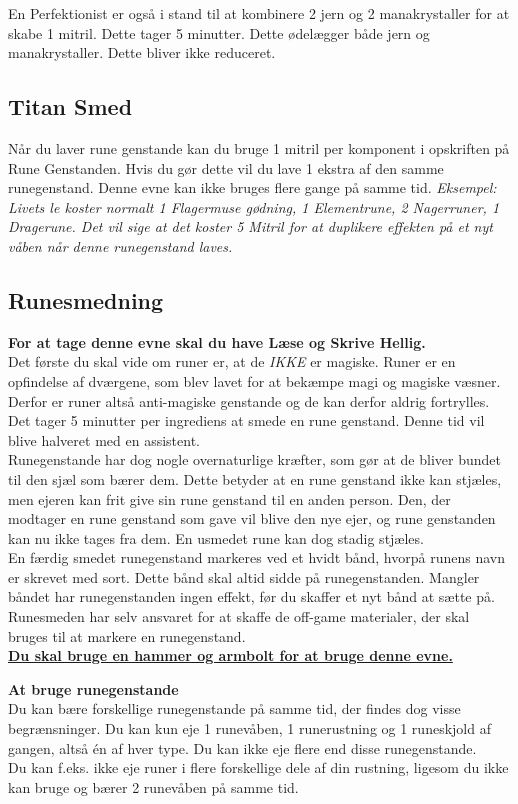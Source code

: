 En Perfektionist er også i stand til at kombinere 2 jern og 2 manakrystaller for at skabe 1 mitril. Dette tager 5 minutter. Dette ødelægger både jern og manakrystaller. Dette bliver ikke reduceret.

\subsection{Titan Smed}
Når du laver rune genstande kan du bruge 1 mitril per komponent i opskriften på Rune Genstanden. Hvis du gør dette vil du lave 1 ekstra af den samme runegenstand. Denne evne kan ikke bruges flere gange på samme tid.
\textit{Eksempel: Livets le koster normalt 1 Flagermuse gødning, 1 Elementrune, 2 Nagerruner, 1 Dragerune. Det vil sige at det koster 5 Mitril for at duplikere effekten på et nyt våben når denne runegenstand laves.}

\subsection{Runesmedning}
\textbf{For at tage denne evne skal du have Læse og Skrive Hellig.}\\
Det første du skal vide om runer er, at de \emph{IKKE} er magiske. Runer er en opfindelse af dværgene, som blev lavet for at bekæmpe magi og magiske væsner. Derfor er runer altså anti-magiske genstande og de kan derfor aldrig fortrylles.\\
Det tager 5 minutter per ingrediens at smede en rune genstand. Denne tid vil blive halveret med en assistent.\\
Runegenstande har dog nogle overnaturlige kræfter, som gør at de bliver bundet til den sjæl som bærer dem. Dette betyder at en rune genstand ikke kan stjæles, men ejeren kan frit give sin rune genstand til en anden person. Den, der modtager en rune genstand som gave vil blive den nye ejer, og rune genstanden kan nu ikke tages fra dem. En usmedet rune kan dog stadig stjæles.\\

En færdig smedet runegenstand markeres ved et hvidt bånd, hvorpå runens navn er skrevet med sort. Dette bånd skal altid sidde på runegenstanden. Mangler båndet har runegenstanden ingen effekt, før du skaffer et nyt bånd at sætte på. Runesmeden har selv ansvaret for at skaffe de off-game materialer, der skal bruges til at markere en runegenstand.\\
\textbf{\underline{Du skal bruge en hammer og armbolt for at bruge denne evne.}}

\textbf{At bruge runegenstande}\\
Du kan bære forskellige runegenstande på samme tid, der findes dog visse begrænsninger. Du kan kun eje 1 runevåben, 1 runerustning og 1 runeskjold af gangen, altså én af hver type. Du kan ikke eje flere end disse runegenstande.\\
Du kan f.eks. ikke eje runer i flere forskellige dele af din rustning, ligesom du ikke kan bruge og bærer 2 runevåben på samme tid.\\

